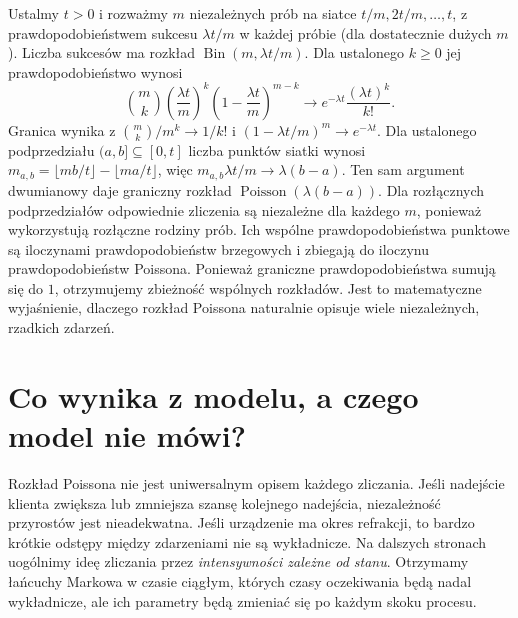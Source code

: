 \begin{przyklad}
Ustalmy $t>0$ i rozważmy $m$ niezależnych prób
na siatce $t/m,2t/m,\ldots,t$, z prawdopodobieństwem
sukcesu $\lambda t/m$ w każdej próbie (dla dostatecznie
dużych $m$). Liczba sukcesów ma rozkład
$\operatorname{Bin}(m,\lambda t/m)$.
Dla ustalonego $k\ge0$ jej prawdopodobieństwo wynosi
\[
\binom mk\left(\frac{\lambda t}{m}\right)^k
\left(1-\frac{\lambda t}{m}\right)^{m-k}
\longrightarrow e^{-\lambda t}\frac{(\lambda t)^k}{k!}.
\]
Granica wynika z
$\binom mk/m^k\to1/k!$ i
$(1-\lambda t/m)^m\to e^{-\lambda t}$.
Dla ustalonego podprzedziału $(a,b]\subseteq[0,t]$
liczba punktów siatki wynosi
$m_{a,b}=\lfloor mb/t\rfloor-\lfloor ma/t\rfloor$,
więc $m_{a,b}\lambda t/m\to\lambda(b-a)$.
Ten sam argument dwumianowy daje graniczny rozkład
$\operatorname{Poisson}(\lambda(b-a))$.
Dla rozłącznych podprzedziałów odpowiednie zliczenia
są niezależne dla każdego $m$, ponieważ wykorzystują
rozłączne rodziny prób. Ich wspólne prawdopodobieństwa
punktowe są iloczynami prawdopodobieństw brzegowych
i zbiegają do iloczynu prawdopodobieństw Poissona.
Ponieważ graniczne prawdopodobieństwa sumują się do $1$,
otrzymujemy zbieżność wspólnych rozkładów. Jest to matematyczne wyjaśnienie,
dlaczego rozkład Poissona naturalnie opisuje wiele
niezależnych, rzadkich zdarzeń.
\end{przyklad}

\section{Co wynika z modelu, a czego model nie mówi?}
Rozkład Poissona nie jest uniwersalnym opisem każdego
zliczania. Jeśli nadejście klienta zwiększa lub zmniejsza
szansę kolejnego nadejścia, niezależność przyrostów jest
nieadekwatna. Jeśli urządzenie ma okres refrakcji, to
bardzo krótkie odstępy między zdarzeniami nie są wykładnicze.
Na dalszych stronach uogólnimy ideę zliczania przez
\emph{intensywności zależne od stanu}. Otrzymamy łańcuchy
Markowa w czasie ciągłym, których czasy oczekiwania będą
nadal wykładnicze, ale ich parametry będą zmieniać się
po każdym skoku procesu.
